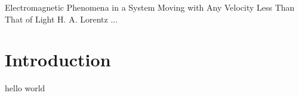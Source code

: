 \paperheader
    {Electromagnetic Phenomena in a System Moving with Any Velocity Less Than That of Light}
    {H. A. Lorentz}
    {...}


\section{Introduction}
hello world